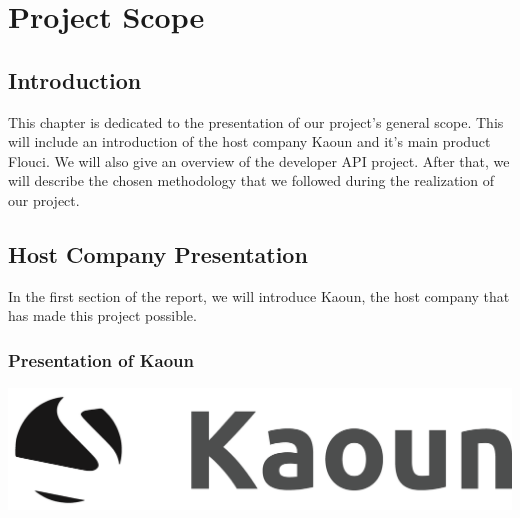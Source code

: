 \setcounter{chapter}{0} %
\chapter{Project Scope}
\adjustmtc
\minitoc  %

\graphicspath{{Chapter1/figures/}}
\pagestyle{fancy}
\fancyhf{}
\fancyhead[R]{\bfseries\rightmark}
\fancyfoot[R]{\thepage}
\renewcommand{\headrulewidth}{0.5pt}
\renewcommand{\footrulewidth}{0pt}
\renewcommand{\chaptermark}[1]{\markboth{\MakeUppercase{\chaptername~\thechapter. #1 }}{}}
\renewcommand{\sectionmark}[1]{\markright{\thechapter.\thesection~ #1}}

\begin{spacing}{1.2}

\section*{Introduction}
This chapter is dedicated to the presentation of our project's general scope.
This will include an introduction of the host company Kaoun and it's main product Flouci. We will also give an overview of the developer API project. After that, we will describe the chosen methodology that we followed during the realization of our project.
\section{Host Company Presentation}
In the first section of the report, we will introduce Kaoun, the host company that has made this project possible.
\subsection{Presentation of Kaoun}
\begin{center}
	\includegraphics[scale=0.2]{kaounlogo.png}
\end{center}




\end{spacing}
